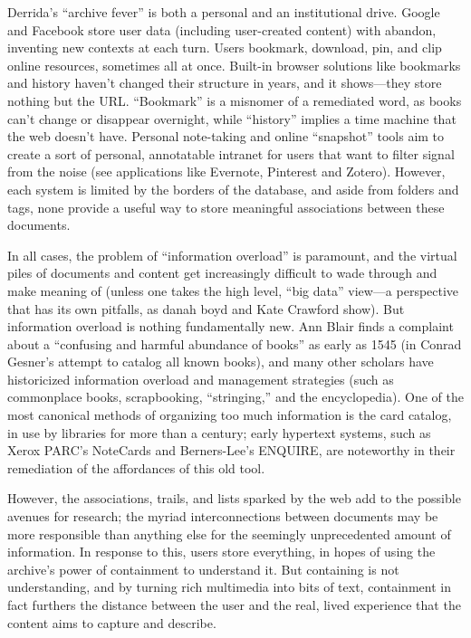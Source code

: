 Derrida’s “archive fever” is both a personal and an institutional drive. Google and Facebook store user data (including user-created content) with abandon, inventing new contexts at each turn. Users bookmark, download, pin, and clip online resources, sometimes all at once. Built-in browser solutions like bookmarks and history haven’t changed their structure in years, and it shows—they store nothing but the URL. “Bookmark” is a misnomer of a remediated word, as books can’t change or disappear overnight, while “history” implies a time machine that the web doesn’t have. Personal note-taking and online “snapshot” tools aim to create a sort of personal, annotatable intranet for users that want to filter signal from the noise (see applications like Evernote, Pinterest and Zotero). However, each system is limited by the borders of the database, and aside from folders and tags, none provide a useful way to store meaningful associations between these documents.

In all cases, the problem of “information overload” is paramount, and the virtual piles of documents and content get increasingly difficult to wade through and make meaning of (unless one takes the high level, “big data” view—a perspective that has its own pitfalls, as danah boyd and Kate Crawford show).  But information overload is nothing fundamentally new. Ann Blair finds a complaint about a “confusing and harmful abundance of books” as early as 1545 (in Conrad Gesner’s attempt to catalog all known books), and many other scholars have historicized information overload and management strategies (such as commonplace books, scrapbooking, “stringing,” and the encyclopedia).  One of the most canonical methods of organizing too much information is the card catalog, in use by libraries for more than a century; early hypertext systems, such as Xerox PARC’s NoteCards and Berners-Lee’s ENQUIRE, are noteworthy in their remediation of the affordances of this old tool.

However, the associations, trails, and lists sparked by the web add to the possible avenues for research; the myriad interconnections between documents may be more responsible than anything else for the seemingly unprecedented amount of information. In response to this, users store everything, in hopes of using the archive’s power of containment to understand it. But containing is not understanding, and by turning rich multimedia into bits of text, containment in fact furthers the distance between the user and the real, lived experience that the content aims to capture and describe.

